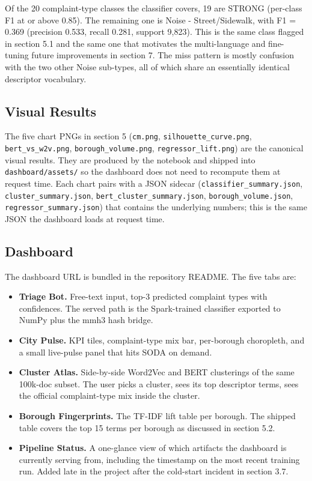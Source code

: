 \documentclass[11pt,letterpaper]{article}
\begin{document}
Of the 20 complaint-type classes the classifier covers, 19 are STRONG (per-class F1 at or above 0.85). The remaining one is Noise - Street/Sidewalk, with F1 = 0.369 (precision 0.533, recall 0.281, support 9,823). This is the same class flagged in section 5.1 and the same one that motivates the multi-language and fine-tuning future improvements in section 7. The miss pattern is mostly confusion with the two other Noise sub-types, all of which share an essentially identical descriptor vocabulary.

\subsection{Visual Results}

The five chart PNGs in section 5 (\texttt{cm.png}, \texttt{silhouette\_curve.png}, \texttt{bert\_vs\_w2v.png}, \texttt{borough\_volume.png}, \texttt{regressor\_lift.png}) are the canonical visual results. They are produced by the notebook and shipped into \texttt{dashboard/assets/} so the dashboard does not need to recompute them at request time. Each chart pairs with a JSON sidecar (\texttt{classifier\_summary.json}, \texttt{cluster\_summary.json}, \texttt{bert\_cluster\_summary.json}, \texttt{borough\_volume.json}, \texttt{regressor\_summary.json}) that contains the underlying numbers; this is the same JSON the dashboard loads at request time.

\subsection{Dashboard}

The dashboard URL is bundled in the repository README. The five tabs are:

\begin{itemize}
  \item \textbf{Triage Bot.} Free-text input, top-3 predicted complaint types with confidences. The served path is the Spark-trained classifier exported to NumPy plus the mmh3 hash bridge.
  \item \textbf{City Pulse.} KPI tiles, complaint-type mix bar, per-borough choropleth, and a small live-pulse panel that hits SODA on demand.
  \item \textbf{Cluster Atlas.} Side-by-side Word2Vec and BERT clusterings of the same 100k-doc subset. The user picks a cluster, sees its top descriptor terms, sees the official complaint-type mix inside the cluster.
  \item \textbf{Borough Fingerprints.} The TF-IDF lift table per borough. The shipped table covers the top 15 terms per borough as discussed in section 5.2.
  \item \textbf{Pipeline Status.} A one-glance view of which artifacts the dashboard is currently serving from, including the timestamp on the most recent training run. Added late in the project after the cold-start incident in section 3.7.
\end{itemize}
\end{document}

